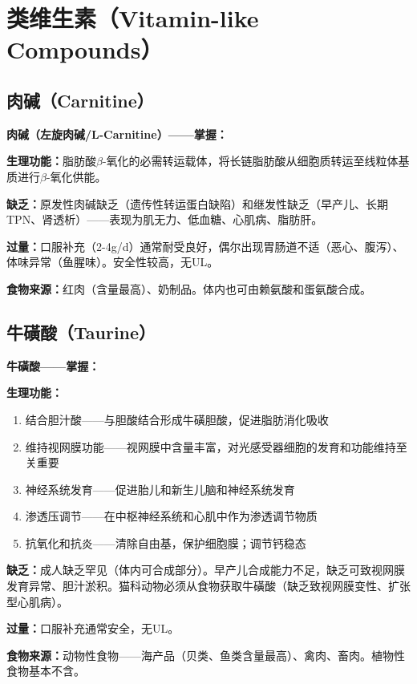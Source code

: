 \section{类维生素（Vitamin-like Compounds）}

\subsection{肉碱（Carnitine）}

\begin{keybox}
\textbf{肉碱（左旋肉碱/L-Carnitine）——掌握：}

\textbf{生理功能：}脂肪酸$\beta$-氧化的必需转运载体，将长链脂肪酸从细胞质转运至线粒体基质进行$\beta$-氧化供能。

\textbf{缺乏：}原发性肉碱缺乏（遗传性转运蛋白缺陷）和继发性缺乏（早产儿、长期TPN、肾透析）——表现为肌无力、低血糖、心肌病、脂肪肝。

\textbf{过量：}口服补充（2-4g/d）通常耐受良好，偶尔出现胃肠道不适（恶心、腹泻）、体味异常（鱼腥味）。安全性较高，无UL。

\textbf{食物来源：}红肉（含量最高）、奶制品。体内也可由赖氨酸和蛋氨酸合成。
\end{keybox}

\subsection{牛磺酸（Taurine）}

\begin{keybox}
\textbf{牛磺酸——掌握：}

\textbf{生理功能：}
\begin{enumerate}[leftmargin=*]
    \item 结合胆汁酸——与胆酸结合形成牛磺胆酸，促进脂肪消化吸收
    \item 维持视网膜功能——视网膜中含量丰富，对光感受器细胞的发育和功能维持至关重要
    \item 神经系统发育——促进胎儿和新生儿脑和神经系统发育
    \item 渗透压调节——在中枢神经系统和心肌中作为渗透调节物质
    \item 抗氧化和抗炎——清除自由基，保护细胞膜；调节钙稳态
\end{enumerate}

\textbf{缺乏：}成人缺乏罕见（体内可合成部分）。早产儿合成能力不足，缺乏可致视网膜发育异常、胆汁淤积。猫科动物必须从食物获取牛磺酸（缺乏致视网膜变性、扩张型心肌病）。

\textbf{过量：}口服补充通常安全，无UL。

\textbf{食物来源：}动物性食物——海产品（贝类、鱼类含量最高）、禽肉、畜肉。植物性食物基本不含。
\end{keybox}

